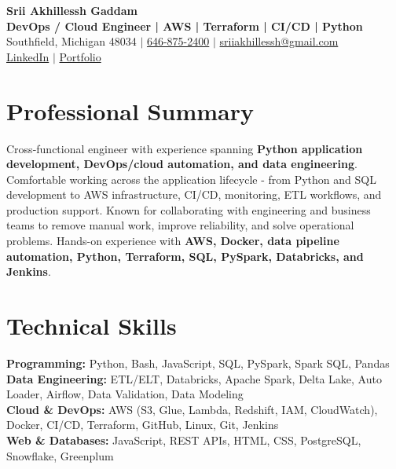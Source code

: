 \documentclass[letterpaper,10pt]{article}
\begin{document}
\fontsize{9.35pt}{10.45pt}\selectfont

\begin{center}
    {\LARGE \textbf{Srii Akhillessh Gaddam}} \\[-1pt]
    \textbf{DevOps / Cloud Engineer | AWS | Terraform | CI/CD | Python} \\[2pt]
    Southfield, Michigan 48034 $|$
    \href{tel:6468752400}{646-875-2400} $|$
    \href{mailto:sriiakhillessh@gmail.com}{sriiakhillessh@gmail.com} \\[1pt]
    \href{https://www.linkedin.com/in/srii-akhiilessh-gaddam-b48668191/}{LinkedIn} $|$
    \href{https://sriiakhillesshg.github.io/portfolio/}{Portfolio}
\end{center}
\vspace{-8pt}

\section{Professional Summary}
\small{Cross-functional engineer with experience spanning \textbf{Python application development, DevOps/cloud automation, and data engineering}. Comfortable working across the application lifecycle - from Python and SQL development to AWS infrastructure, CI/CD, monitoring, ETL workflows, and production support. Known for collaborating with engineering and business teams to remove manual work, improve reliability, and solve operational problems. Hands-on experience with \textbf{AWS, Docker, data pipeline automation, Python, Terraform, SQL, PySpark, Databricks, and Jenkins}.}

\section{Technical Skills}
\small{
\textbf{Programming:} Python, Bash, JavaScript, SQL, PySpark, Spark SQL, Pandas \\
\textbf{Data Engineering:} ETL/ELT, Databricks, Apache Spark, Delta Lake, Auto Loader, Airflow, Data Validation, Data Modeling \\
\textbf{Cloud \& DevOps:} AWS (S3, Glue, Lambda, Redshift, IAM, CloudWatch), Docker, CI/CD, Terraform, GitHub, Linux, Git, Jenkins \\
\textbf{Web \& Databases:} JavaScript, REST APIs, HTML, CSS, PostgreSQL, Snowflake, Greenplum
}
\end{document}
